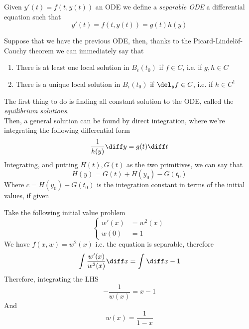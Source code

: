 \documentclass[../mmf.tex]{subfiles}
\begin{document}
\begin{dfn}
	Given $y'(t)=f(t,y(t))$ an ODE we define a \textit{separable ODE} a differential equation such that
	\begin{equation*}
		y'(t)=f(t,y(t))=g(t)h(y)
	\end{equation*}
\end{dfn}
\begin{mtd}
	Suppose that we have the previous ODE, then, thanks to the Picard-Lindelöf-Cauchy theorem we can immediately say that
	\begin{enumerate}
	\item There is at least one local solution in $B_\epsilon(t_0)$ if $f\in C$, i.e. if $g,h\in C$
	\item There is a unique local solution in $B_\epsilon(t_0)$ if $\del_y f\in C$, i.e. if $h\in C^1$
	\end{enumerate}
	The first thing to do is finding all constant solution to the ODE, called the \textit{equilibrium solutions}.\\
	Then, a general solution can be found by direct integration, where we're integrating the following differential form
	\begin{equation*}
		\frac{1}{h(y)}\diff y=g(t)\diff t
	\end{equation*}
	Integrating, and putting $H(t), G(t)$ as the two primitives, we can say that
	\begin{equation*}
		H(y)=G(t)+H(y_0)-G(t_0)
	\end{equation*}
	Where $c=H(y_0)-G(t_0)$ is the integration constant in terms of the initial values, if given
\end{mtd}
\begin{eg}
	Take the following initial value problem
	\begin{equation*}
		\left\{\begin{aligned}
				w'(x)&=w^2(x)\\
				w(0)&=1
		\end{aligned}\right.
	\end{equation*}
	We have $f(x,w)=w^2(x)$ i.e. the equation is separable, therefore
	\begin{equation*}
		\int\frac{w'(x)}{w^2(x)}\diff x=\int_{}^{}\diff x-1
	\end{equation*}
	Therefore, integrating the LHS
	\begin{equation*}
		-\frac{1}{w(x)}=x-1
	\end{equation*}
	And
	\begin{equation*}
		w(x)=\frac{1}{1-x}
	\end{equation*}
\end{eg}
\end{document}
